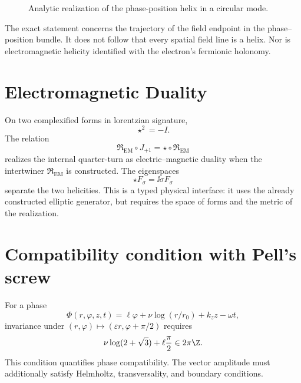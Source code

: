 \begin{figure}[htbp]
\centering
{}
\caption{Analytic realization of the phase-position helix in a circular mode.}
\label{espiral:fig:helice-em}
\end{figure}

The exact statement concerns the trajectory of the field endpoint in the
phase--position bundle. It does not follow that every spatial field line is
a helix. Nor is electromagnetic helicity identified with the
electron's fermionic holonomy.

\section{Electromagnetic Duality}

On two complexified forms in lorentzian signature,
\[
 \star^2=-I.
\]
The relation
\[
 \mathfrak R_{\mathrm{EM}}\circ J_{+1}
 =\star\circ\mathfrak R_{\mathrm{EM}}
\]
realizes the internal quarter-turn as electric--magnetic duality when
the intertwiner \(\mathfrak R_{\mathrm{EM}}\) is constructed. The eigenspaces
\[
 \star F_\sigma=\ii\sigma F_\sigma
\]
separate the two helicities. This is a typed physical interface: it uses the
already constructed elliptic generator, but requires the space of forms and the
metric of the realization.

\section{Compatibility condition with Pell's screw}

For a phase
\[
 \Phi(r,\varphi,z,t)
 =\ell\varphi+\nu\log(r/r_0)+k_zz-\omega t,
\]
invariance under
\((r,\varphi)\mapsto(\varepsilon r,\varphi+\pi/2)\) requires
\begin{equation}
 \nu\log(2+\sqrt3)+\ell\frac\pi2
 \in2\pi\Z.
 \label{espiral:eq:cuantizacion-tornillo-em}
\end{equation}
This condition quantifies phase compatibility. The vector amplitude
must additionally satisfy Helmholtz, transversality, and boundary conditions.
